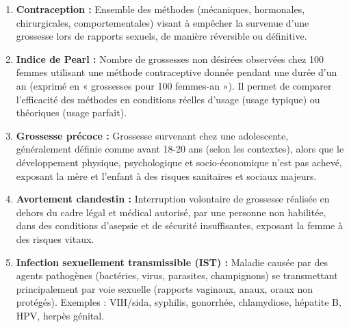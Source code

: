 \documentclass[11pt]{article}
\begin{document}
\begin{corrige}
\begin{enumerate}
\item \textbf{Contraception :} Ensemble des méthodes (mécaniques, hormonales, chirurgicales, comportementales) visant à empêcher la survenue d'une grossesse lors de rapports sexuels, de manière réversible ou définitive.
\item \textbf{Indice de Pearl :} Nombre de grossesses non désirées observées chez 100 femmes utilisant une méthode contraceptive donnée pendant une durée d'un an (exprimé en « grossesses pour 100 femmes-an »). Il permet de comparer l'efficacité des méthodes en conditions réelles d'usage (usage typique) ou théoriques (usage parfait).
\item \textbf{Grossesse précoce :} Grossesse survenant chez une adolescente, généralement définie comme avant 18-20 ans (selon les contextes), alors que le développement physique, psychologique et socio-économique n'est pas achevé, exposant la mère et l'enfant à des risques sanitaires et sociaux majeurs.
\item \textbf{Avortement clandestin :} Interruption volontaire de grossesse réalisée en dehors du cadre légal et médical autorisé, par une personne non habilitée, dans des conditions d'asepsie et de sécurité insuffisantes, exposant la femme à des risques vitaux.
\item \textbf{Infection sexuellement transmissible (IST) :} Maladie causée par des agents pathogènes (bactéries, virus, parasites, champignons) se transmettant principalement par voie sexuelle (rapports vaginaux, anaux, oraux non protégés). Exemples : VIH/sida, syphilis, gonorrhée, chlamydiose, hépatite B, HPV, herpès génital.
\end{enumerate}
\end{corrige}
\end{document}
